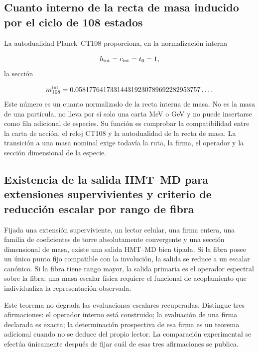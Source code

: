 \subsection{Cuanto interno de la recta de masa inducido por el ciclo de 108 estados}
La autodualidad Planck--CT108 proporciona, en la normalización interna

\[
\hbar_{\rm int}=c_{\rm int}=t_0=1,
\]
la sección

\[
m_{108}^{\rm int}
=0.058177641733144319230789692282953757\ldots .
\]
Este número es un cuanto normalizado de la recta interna de masa. No es la masa de una partícula, no lleva por sí solo una carta MeV o GeV y no puede insertarse como fila adicional de especies. Su función es comprobar la compatibilidad entre la carta de acción, el reloj CT108 y la autodualidad de la recta de masa. La transición a una masa nominal exige todavía la ruta, la firma, el operador y la sección dimensional de la especie.

\subsection{Existencia de la salida HMT–MD para extensiones supervivientes y criterio de reducción escalar por rango de fibra}
Fijada una extensión superviviente, un lector celular, una firma entera, una familia de coeficientes de torre absolutamente convergente y una sección dimensional de masa, existe una salida HMT--MD bien tipada. Si la fibra posee un único punto fijo compatible con la involución, la salida se reduce a un escalar canónico. Si la fibra tiene rango mayor, la salida primaria es el operador espectral sobre la fibra; una masa escalar física requiere el funcional de acoplamiento que individualiza la representación observada.

Este teorema no degrada las evaluaciones escalares recuperadas. Distingue tres afirmaciones: el operador interno está construido; la evaluación de una firma declarada es exacta; la determinación prospectiva de esa firma es un teorema adicional cuando no se deduce del propio lector. La comparación experimental se efectúa únicamente después de fijar cuál de esas tres afirmaciones se publica.


